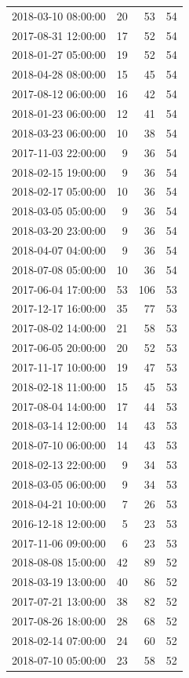 \begin{tabular}{lrrr}
2018-03-10 08:00:00 & 20 & 53 & 54 \\
2017-08-31 12:00:00 & 17 & 52 & 54 \\
2018-01-27 05:00:00 & 19 & 52 & 54 \\
2018-04-28 08:00:00 & 15 & 45 & 54 \\
2017-08-12 06:00:00 & 16 & 42 & 54 \\
2018-01-23 06:00:00 & 12 & 41 & 54 \\
2018-03-23 06:00:00 & 10 & 38 & 54 \\
2017-11-03 22:00:00 & 9 & 36 & 54 \\
2018-02-15 19:00:00 & 9 & 36 & 54 \\
2018-02-17 05:00:00 & 10 & 36 & 54 \\
2018-03-05 05:00:00 & 9 & 36 & 54 \\
2018-03-20 23:00:00 & 9 & 36 & 54 \\
2018-04-07 04:00:00 & 9 & 36 & 54 \\
2018-07-08 05:00:00 & 10 & 36 & 54 \\
2017-06-04 17:00:00 & 53 & 106 & 53 \\
2017-12-17 16:00:00 & 35 & 77 & 53 \\
2017-08-02 14:00:00 & 21 & 58 & 53 \\
2017-06-05 20:00:00 & 20 & 52 & 53 \\
2017-11-17 10:00:00 & 19 & 47 & 53 \\
2018-02-18 11:00:00 & 15 & 45 & 53 \\
2017-08-04 14:00:00 & 17 & 44 & 53 \\
2018-03-14 12:00:00 & 14 & 43 & 53 \\
2018-07-10 06:00:00 & 14 & 43 & 53 \\
2018-02-13 22:00:00 & 9 & 34 & 53 \\
2018-03-05 06:00:00 & 9 & 34 & 53 \\
2018-04-21 10:00:00 & 7 & 26 & 53 \\
2016-12-18 12:00:00 & 5 & 23 & 53 \\
2017-11-06 09:00:00 & 6 & 23 & 53 \\
2018-08-08 15:00:00 & 42 & 89 & 52 \\
2018-03-19 13:00:00 & 40 & 86 & 52 \\
2017-07-21 13:00:00 & 38 & 82 & 52 \\
2017-08-26 18:00:00 & 28 & 68 & 52 \\
2018-02-14 07:00:00 & 24 & 60 & 52 \\
2018-07-10 05:00:00 & 23 & 58 & 52 \\

\end{tabular}
